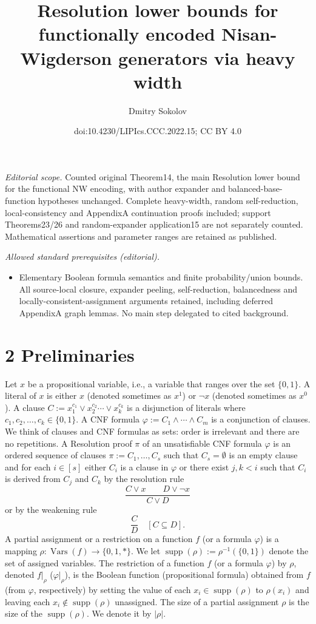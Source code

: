 \documentclass[10pt,a4paper]{article}
\title{Resolution lower bounds for functionally encoded Nisan-Wigderson generators via heavy width}
\author{Dmitry Sokolov}
\date{doi:10.4230/LIPIcs.CCC.2022.15; CC BY 4.0}
\begin{document}
\maketitle
\noindent\textit{Editorial scope.} Counted original Theorem14, the main Resolution lower bound for the functional NW encoding, with author expander and balanced-base-function hypotheses unchanged. Complete heavy-width, random self-reduction, local-consistency and AppendixA continuation proofs included; support Theorems23/26 and random-expander application15 are not separately counted. Mathematical assertions and parameter ranges are retained as published.\par\medskip
\noindent\textit{Allowed standard prerequisites (editorial).}\begin{itemize}
\item Elementary Boolean formula semantics and finite probability/union bounds. All source-local closure, expander peeling, self-reduction, balancedness and locally-consistent-assignment arguments retained, including deferred AppendixA graph lemmas. No main step delegated to cited background.
\end{itemize}\medskip
\section*{2 Preliminaries}
Let $x$ be a propositional variable, i.e., a variable that ranges over the set $\{0,1\}$. A literal of $x$ is either $x$ (denoted sometimes as $x^1$) or $\neg x$ (denoted sometimes as $x^0$). A clause $C:=x_1^{c_1}\vee x_2^{c_2}\cdots\vee x_k^{c_k}$ is a disjunction of literals where $c_1,c_2,\ldots,c_k\in\{0,1\}$. A CNF formula $\varphi:=C_1\wedge\cdots\wedge C_m$ is a conjunction of clauses. We think of clauses and CNF formulas as sets: order is irrelevant and there are no repetitions.
A Resolution proof $\pi$ of an unsatisfiable CNF formula $\varphi$ is an ordered sequence of clauses $\pi:=C_1,\ldots,C_s$ such that $C_s=\emptyset$ is an empty clause and for each $i\in[s]$ either $C_i$ is a clause in $\varphi$ or there exist $j,k<i$ such that $C_i$ is derived from $C_j$ and $C_k$ by the resolution rule
\[\frac{C\vee x\qquad D\vee\neg x}{C\vee D}\]
or by the weakening rule
\[\frac CD\quad[C\subseteq D].\]
A partial assignment or a restriction on a function $f$ (or a formula $\varphi$) is a mapping $\rho:\operatorname{Vars}(f)\to\{0,1,*\}$. We let $\operatorname{supp}(\rho):=\rho^{-1}(\{0,1\})$ denote the set of assigned variables. The restriction of a function $f$ (or a formula $\varphi$) by $\rho$, denoted $f|_\rho$ ($\varphi|_\rho$), is the Boolean function (propositional formula) obtained from $f$ (from $\varphi$, respectively) by setting the value of each $x_i\in\operatorname{supp}(\rho)$ to $\rho(x_i)$ and leaving each $x_i\notin\operatorname{supp}(\rho)$ unassigned.
The size of a partial assignment $\rho$ is the size of the $\operatorname{supp}(\rho)$. We denote it by $|\rho|$.
\end{document}
